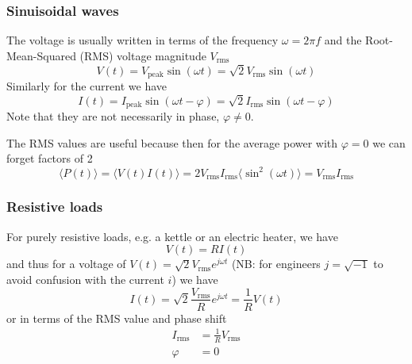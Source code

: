 \documentclass[10pt,dvipsnames]{beamer}
\begin{document}
\begin{frame}
  \frametitle{Sinuisoidal waves}

  The voltage is usually written in terms of the frequency $\omega =
  2\pi f$ and the \alert{Root-Mean-Squared (RMS)} voltage magnitude $V_{\textrm{rms}}$
  \begin{equation*}
    V(t) = V_{\textrm{peak}} \sin(\omega t) = \sqrt{2} V_{\textrm{rms}} \sin(\omega t)
  \end{equation*}
  Similarly for the current we have
  \begin{equation*}
    I(t) = I_{\textrm{peak}} \sin(\omega t - \varphi) = \sqrt{2} I_{\textrm{rms}} \sin(\omega t - \varphi)
  \end{equation*}
  Note that they are not necessarily in phase, $\varphi \neq 0$.

  The RMS values are useful because then for the \alert{average power} with $\varphi = 0$ we can forget factors of 2
  \begin{equation*}
    \langle P(t) \rangle = \langle V(t)I(t) \rangle = 2 V_{\textrm{rms}} I_{\textrm{rms}} \langle\sin^2(\omega t)\rangle = V_{\textrm{rms}} I_{\textrm{rms}}
  \end{equation*}


\end{frame}



\begin{frame}
  \frametitle{Resistive loads}

  For purely \alert{resistive loads}, e.g. a kettle or an electric heater, we have
  \begin{equation*}
    V(t) = R I(t)
  \end{equation*}
  and thus for a voltage of $V(t) = \sqrt{2} V_{\textrm{rms}}
  e^{j\omega t}$ (NB: for engineers $j = \sqrt{-1}$ to avoid confusion
  with the current $i$) we have
  \begin{equation*}
    I(t) = \sqrt{2} \frac{V_{\textrm{rms}}}{R} e^{j\omega t} = \frac{1}{R} V(t)
  \end{equation*}
  or in terms of the RMS value and phase shift
  \begin{align*}
    I_{\textrm{rms}} & = \frac{1}{R} V_{\textrm{rms}} \\
    \varphi & = 0
  \end{align*}


\end{frame}
\end{document}
